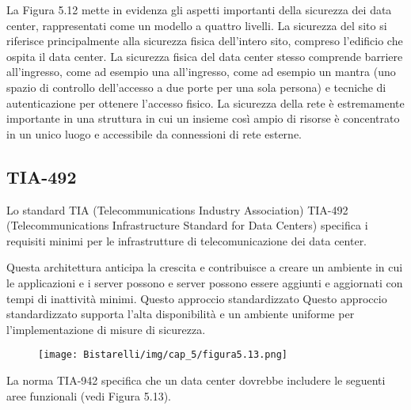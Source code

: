 La Figura 5.12 mette in evidenza gli aspetti importanti della sicurezza dei data center, rappresentati come un modello a quattro livelli. La sicurezza del sito si riferisce principalmente alla sicurezza fisica dell'intero sito, compreso l'edificio che ospita il data center. La sicurezza fisica del data center stesso comprende barriere all'ingresso, come ad esempio una all'ingresso, come ad esempio un mantra (uno spazio di controllo dell'accesso a due porte per una sola persona) e tecniche di autenticazione per ottenere l'accesso fisico. La sicurezza della rete è estremamente importante in una struttura in cui un insieme così ampio di risorse è concentrato in un unico luogo e accessibile da connessioni di rete esterne. 
\subsection{TIA-492}
Lo standard TIA (Telecommunications Industry Association) TIA-492 (Telecommunications Infrastructure Standard for Data Centers) specifica i requisiti minimi per le infrastrutture di telecomunicazione dei data center. 

\singlespacing

Questa architettura anticipa la crescita e contribuisce a creare un ambiente in cui le applicazioni e i server possono
e server possono essere aggiunti e aggiornati con tempi di inattività minimi. Questo approccio standardizzato
Questo approccio standardizzato supporta l'alta disponibilità e un ambiente uniforme per l'implementazione di misure di sicurezza. 

\begin{figure}[H]
	\centering
    \texttt{[image: Bistarelli/img/cap\_5/figura5.13.png]}
\end{figure}

\singlespacing

La norma TIA-942 specifica che un data center dovrebbe includere le seguenti aree funzionali (vedi Figura 5.13).

